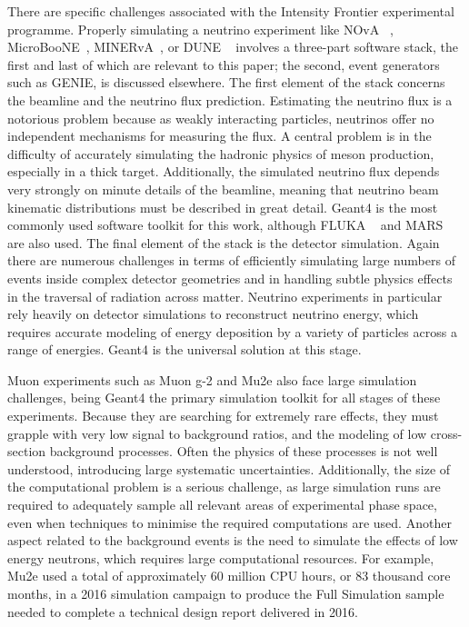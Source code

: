 \documentclass[12pt,a4paper]{article}
\begin{document}
There are specific challenges associated with the Intensity Frontier
experimental programme. Properly simulating a neutrino experiment like
NOvA ~\cite{1742-6596-396-2-022014}, MicroBooNE~\cite{MicroBooNE}, 
MINERvA~\cite{Aliaga:2013uqz}, or DUNE ~\cite{Acciarri:2015uup}
involves a three-part software stack, the first and last of which are
relevant to this paper; the second, event generators such as GENIE, 
is discussed elsewhere. The first element of the stack concerns
the beamline and the neutrino flux prediction. Estimating the neutrino
flux is a notorious problem because as weakly interacting particles,
neutrinos offer no independent mechanisms for measuring the flux. A
central problem is in the difficulty of accurately simulating the
hadronic physics of meson production, especially in a thick target.
Additionally, the simulated neutrino flux depends very strongly on
minute details of the beamline, meaning that neutrino beam kinematic
distributions must be described in great detail. Geant4 is the most
commonly used software toolkit for this work, although FLUKA ~\cite{Ferrari:2005zk} 
and MARS ~\cite{MARS} are also used. The final element of the stack is the
detector simulation. Again there are numerous challenges in terms of
efficiently simulating large numbers of events inside complex detector
geometries and in handling subtle physics effects in the traversal of
radiation across matter. Neutrino experiments in particular rely heavily
on detector simulations to reconstruct neutrino energy, which requires
accurate modeling of energy deposition by a variety of particles across
a range of energies. Geant4 is the universal solution at this stage.

Muon experiments such as Muon g-2 and Mu2e also face large simulation
challenges, being Geant4 the primary simulation toolkit for
all stages of these experiments. Because they are searching for extremely rare effects, they
must grapple with very low signal to background ratios, and the modeling
of low cross-section background processes. Often the physics of these
processes is not well understood, introducing large systematic
uncertainties. Additionally, the size of the computational problem is a
serious challenge, as large simulation runs are required to adequately
sample all relevant areas of experimental phase space, even when
techniques to minimise the required computations are used. Another
aspect related to the background events is the need to simulate the
effects of low energy neutrons, which requires large computational
resources. For example, Mu2e used a total of approximately 60 million
CPU hours, or 83 thousand core months, in a 2016 simulation campaign to
produce the Full Simulation sample needed to complete a technical design
report delivered in 2016. 
\end{document}
